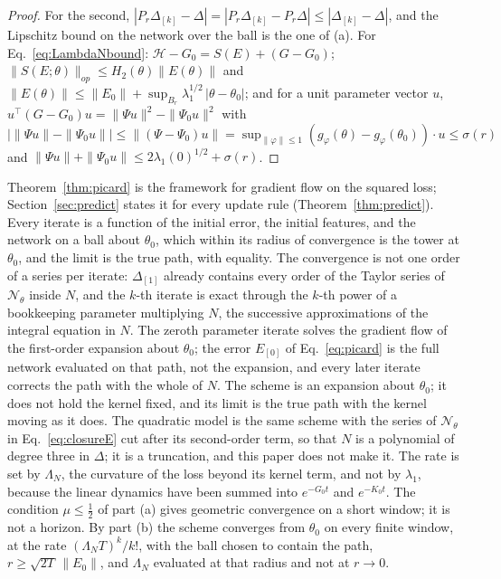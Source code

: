 \documentclass[11pt]{article}
\theoremstyle{definition}
\theoremstyle{remark}
\newcommand{\Net}{\mathcal{N}_\theta}    %
\newcommand{\Hess}{\mathcal{H}}          %
\begin{document}
\begin{proof}
For the second, $|P_r\Delta_{[k]} - \Delta| = |P_r\Delta_{[k]} - P_r\Delta|\le|\Delta_{[k]} - \Delta|$, and the Lipschitz bound on the network over the ball is the one of (a).
For Eq.~\eqref{eq:LambdaNbound}: $\Hess - G_0 = S(E) + (G - G_0)$; $\|S(E;\theta)\|_{op}\le H_2(\theta)\|E(\theta)\|$ and $\|E(\theta)\|\le\|E_0\| + \sup_{B_r}\lambda_1^{1/2}\,|\theta - \theta_0|$; and for a unit parameter vector $u$, $u^\top(G - G_0)u = \|\Psi u\|^2 - \|\Psi_0u\|^2$ with $\big|\|\Psi u\| - \|\Psi_0u\|\big|\le\|(\Psi - \Psi_0)u\| = \sup_{\|\varphi\|\le1}(g_\varphi(\theta) - g_\varphi(\theta_0))\cdot u\le\sigma(r)$ and $\|\Psi u\| + \|\Psi_0u\|\le2\lambda_1(0)^{1/2} + \sigma(r)$.
\end{proof}

Theorem~\ref{thm:picard} is the framework for gradient flow on the squared loss; Section~\ref{sec:predict} states it for every update rule (Theorem~\ref{thm:predict}).
Every iterate is a function of the initial error, the initial features, and the network on a ball about $\theta_0$, which within its radius of convergence is the tower at $\theta_0$, and the limit is the true path, with equality.
The convergence is not one order of a series per iterate: $\Delta_{[1]}$ already contains every order of the Taylor series of $\Net$ inside $N$, and the $k$-th iterate is exact through the $k$-th power of a bookkeeping parameter multiplying $N$, the successive approximations of the integral equation in $N$.
The zeroth parameter iterate solves the gradient flow of the first-order expansion about $\theta_0$; the error $E_{[0]}$ of Eq.~\eqref{eq:picard} is the full network evaluated on that path, not the expansion, and every later iterate corrects the path with the whole of $N$.
The scheme is an expansion about $\theta_0$; it does not hold the kernel fixed, and its limit is the true path with the kernel moving as it does.
The quadratic model is the same scheme with the series of $\Net$ in Eq.~\eqref{eq:closureE} cut after its second-order term, so that $N$ is a polynomial of degree three in $\Delta$; it is a truncation, and this paper does not make it.
The rate is set by $\Lambda_N$, the curvature of the loss beyond its kernel term, and not by $\lambda_1$, because the linear dynamics have been summed into $e^{-G_0t}$ and $e^{-K_0t}$.
The condition $\mu\le\frac12$ of part (a) gives geometric convergence on a short window; it is not a horizon.
By part (b) the scheme converges from $\theta_0$ on every finite window, at the rate $(\Lambda_NT)^k/k!$, with the ball chosen to contain the path, $r\ge\sqrt{2T}\,\|E_0\|$, and $\Lambda_N$ evaluated at that radius and not at $r\to0$.
\end{document}
